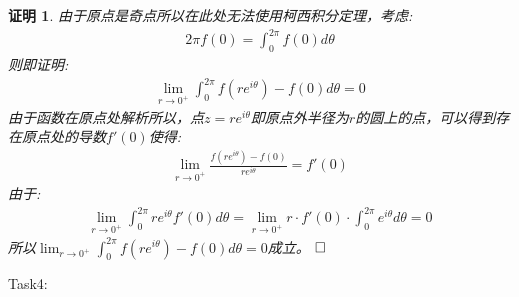 \documentclass{ctexart}
\newcommand{\。}{．} %
\newenvironment{lanse}{
    \begin{tcolorbox}[breakable,enhanced, colback=qlan, boxrule=0pt, frame hidden,
        borderline west={0.7mm}{0.1mm}{slan}]
    }
    {\end{tcolorbox}}
\theoremstyle{t} %
\newtheorem*{zmhj}{\color{slan} 证明}
\newenvironment{zm}{\begin{lanse}\begin{zmhj}}{$\hfill \square$\end{zmhj}\end{lanse}}
\begin{document}
\begin{zm}
    由于原点是奇点所以在此处无法使用柯西积分定理，考虑:
    \begin{align*}
        2\pi f(0)=\int_{0}^{2\pi}f(0)d\theta
    \end{align*}
    则即证明:
    \begin{align*}
        \lim_{r\to 0^+}\int_{0}^{2\pi}f(re^{i\theta})-f(0)d\theta=0
    \end{align*}
    由于函数在原点处解析所以，点$z=re^{i\theta}$即原点外半径为$r$的圆上的点，可以得到存在原点处的导数$f'(0)$使得:
    \begin{align*}
        \lim_{r\to 0^+}\frac{f(re^{i\theta})-f(0)}{re^{i\theta}}=f'(0)
    \end{align*}
    由于:
    \begin{align*}
        \lim_{r\to 0^+}\int_{0}^{2\pi}re^{i\theta}f'(0)d\theta=\lim_{r\to 0^+}r\cdot f'(0)\cdot \int_{0}^{2\pi}e^{i\theta}d\theta=0
    \end{align*}
    所以$\lim_{r\to 0^+}\int_{0}^{2\pi}f(re^{i\theta})-f(0)d\theta=0$成立。
\end{zm}
Task4:
\end{document}
